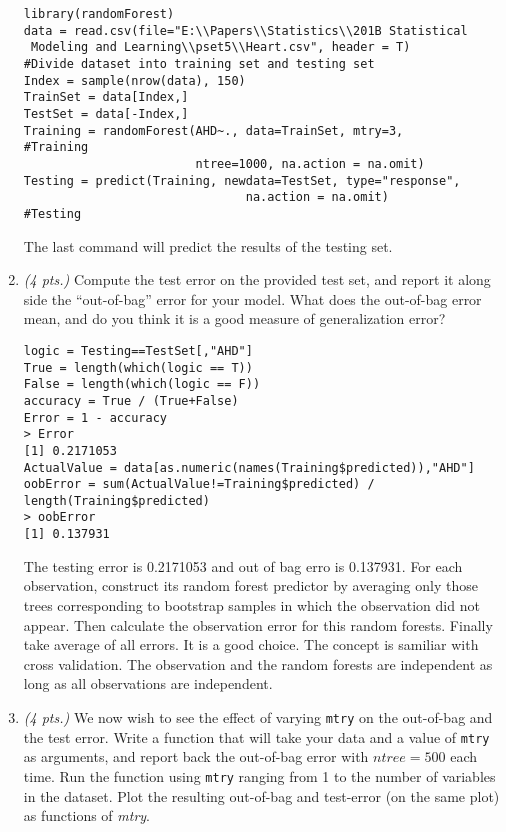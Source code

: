 \documentclass[11pt,english]{article}
\begin{document}
\begin{enumerate}
\begin{verbatim}
library(randomForest)
data = read.csv(file="E:\\Papers\\Statistics\\201B Statistical
 Modeling and Learning\\pset5\\Heart.csv", header = T)
#Divide dataset into training set and testing set
Index = sample(nrow(data), 150)
TrainSet = data[Index,]
TestSet = data[-Index,]
Training = randomForest(AHD~., data=TrainSet, mtry=3,         #Training
                        ntree=1000, na.action = na.omit)
Testing = predict(Training, newdata=TestSet, type="response",
                               na.action = na.omit)           #Testing
\end{verbatim}
The last command will predict the results of the testing set.


\item \textit{(4 pts.)} Compute the test error on the provided test set, and report it along side the ``out-of-bag'' error for your model. What does the out-of-bag error mean, and do you think it is a good measure of generalization error?
\begin{verbatim}
logic = Testing==TestSet[,"AHD"]
True = length(which(logic == T))
False = length(which(logic == F))
accuracy = True / (True+False)
Error = 1 - accuracy
> Error
[1] 0.2171053
ActualValue = data[as.numeric(names(Training$predicted)),"AHD"]
oobError = sum(ActualValue!=Training$predicted) / length(Training$predicted)
> oobError
[1] 0.137931
\end{verbatim}
The testing error is 0.2171053 and out of bag erro is 0.137931.  For each observation, construct its random forest predictor by averaging only those trees corresponding to bootstrap samples in which the observation did not appear.  Then calculate the observation error for this random forests.  Finally take average of all errors.  It is a good choice.  The concept is samiliar with cross validation.  The observation and the random forests are independent as long as all observations are independent.


\item \textit{(4 pts.)} We now wish to see the effect of varying \texttt{mtry} on the out-of-bag and the test error. Write a function that will take your data and a value of \texttt{mtry} as arguments, and report back the out-of-bag error with  $ntree=500$ each time.  Run the function using \texttt{mtry} ranging from 1 to the number of variables in the dataset. Plot the resulting out-of-bag and test-error (on the same plot) as functions of \textit{mtry}.
\begin{verbatim}


\end{verbatim}
\end{enumerate}
\end{document}
